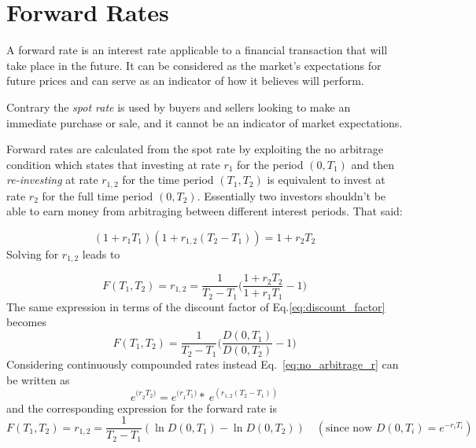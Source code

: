 \section{Forward Rates}\label{calculating-forward-rates}
A forward rate is an interest rate applicable to a financial transaction that will take place in the future. It can be considered as the market's expectations for future prices and can serve as an indicator of how it believes will perform.

Contrary the \emph{spot rate} is used by buyers and sellers looking 
to make an immediate purchase or sale, and it cannot be an indicator of market expectations.

Forward rates are calculated from the spot rate by exploiting the no arbitrage condition which states that investing at rate \(r_1\) for the period \((0, T_1)\) and then \emph{re-investing} at rate \(r_{1,2}\) for the time period \((T_1, T_2)\) is equivalent to invest at rate \(r_2\) for the full time period \((0, T_2)\). Essentially two investors shouldn't be able to earn money from arbitraging between different interest periods. That said:

\begin{equation}
(1+r_1 T_1)(1+r_{1,2}(T_2 - T_1)) = 1 + r_2 T_2
\label{eq:no_arbitrage_r}
\end{equation}
Solving for \(r_{1,2}\) leads to

\begin{equation}
F(T_1, T_2) = r_{1,2} = \frac{1}{T_2 - T_1}\Big(\frac{1+r_2 T_2}{1+r_1 T_1} - 1 \Big)
\label{eq:forward_rate_simple}
\end{equation}
\vspace{1cm}
The same expression in terms of the discount factor of Eq.\ref{eq:discount_factor} becomes
\begin{equation}
F(T_1, T_2) = \frac{1}{T_2 - T_1}\Big(\frac{D(0, T_1)}{D(0, T_2)} - 1 \Big)
\end{equation}
Considering continuously compounded rates instead Eq.~\ref{eq:no_arbitrage_r} can be written as
\begin{equation*}
e^{{(r}_{2}T_{2})}=e^{{(r}_{1}T_{1})}\ast \ e^{\left(r_{1,2} \left(T_{2}-T_{1}\right)\right)}
\end{equation*}
and the corresponding expression for the forward rate is
\begin{equation}
F(T_1, T_2) = r_{1,2} = \frac {1}{T_{2}-T_{1}}(\ln D(0,T_{1})-\ln D(0,T_{2}))
\quad(\textrm{since now } D(0, T_i)=e^{-r_i T_i})
\label{eq:forward_rate_continous}
\end{equation}

